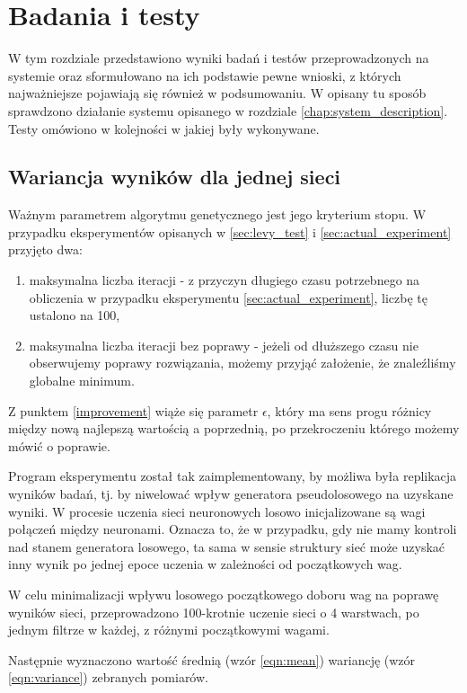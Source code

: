 \chapter{Badania i testy}\label{chap:tests}
W tym rozdziale przedstawiono wyniki badań i testów przeprowadzonych na systemie oraz sformułowano na ich podstawie pewne wnioski, z których najważniejsze pojawiają się również w podsumowaniu.
W opisany tu sposób sprawdzono działanie systemu opisanego w rozdziale \ref{chap:system_description}.
Testy omówiono w kolejności w jakiej były wykonywane.
\section{Wariancja wyników dla jednej sieci}\label{sec:std_dev}
Ważnym parametrem algorytmu genetycznego jest jego kryterium stopu.
W przypadku eksperymentów opisanych w \ref{sec:levy_test} i \ref{sec:actual_experiment} przyjęto dwa:
\begin{enumerate}
  \item maksymalna liczba iteracji - z przyczyn długiego czasu potrzebnego na obliczenia w przypadku eksperymentu \ref{sec:actual_experiment}, liczbę tę ustalono na 100,
  \item maksymalna liczba iteracji bez poprawy - jeżeli od dłuższego czasu nie obserwujemy poprawy rozwiązania, możemy przyjąć założenie, że znaleźliśmy globalne minimum\label{improvement}.
\end{enumerate}
Z punktem \ref{improvement} wiąże się parametr $\epsilon$, który ma sens progu różnicy między nową najlepszą wartością a poprzednią, po przekroczeniu którego możemy mówić o poprawie.

Program eksperymentu został tak zaimplementowany, by możliwa była replikacja wyników badań, tj. by niwelować wpływ generatora pseudolosowego na uzyskane wyniki.
W procesie uczenia sieci neuronowych losowo inicjalizowane są wagi połączeń między neuronami.
Oznacza to, że w przypadku, gdy nie mamy kontroli nad stanem generatora losowego, ta sama w sensie struktury sieć może uzyskać inny wynik po jednej epoce uczenia w zależności od początkowych wag.

W celu minimalizacji wpływu losowego początkowego doboru wag na poprawę wyników sieci, przeprowadzono 100-krotnie uczenie sieci o 4 warstwach, po jednym filtrze w każdej, z różnymi początkowymi wagami.

Następnie wyznaczono wartość średnią (wzór \ref{eqn:mean}) wariancję (wzór \ref{eqn:variance}) zebranych pomiarów.

